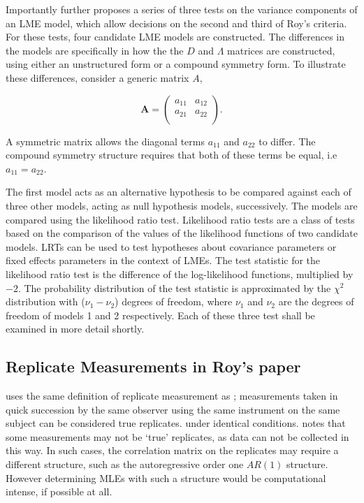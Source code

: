 \documentclass[12pt, a4paper]{report}
\theoremstyle{plain}
\theoremstyle{definition}
\theoremstyle{remark}
\begin{document}
		Importantly \citet{ARoy2009} further proposes a series of three tests on the variance components of an LME model, which allow decisions on the second and third of Roy's criteria. For these tests, four candidate LME models are constructed. The differences in the models are specifically in how the the $D$ and $\Lambda$ matrices are constructed, using either an unstructured form or a compound symmetry form. To illustrate these differences, consider a generic matrix $A$,
		
		\[
		\boldsymbol{A} = \left( \begin{array}{cc}
		a_{11} & a_{12}  \\
		a_{21} & a_{22}  \\
		\end{array}\right).
		\]
		
		A symmetric matrix allows the diagonal terms $a_{11}$ and $a_{22}$ to differ. The compound symmetry structure requires that both of these terms be equal, i.e $a_{11} = a_{22}$.
		
		The first model acts as an alternative hypothesis to be compared against each of three other models, acting as null hypothesis models, successively. The models are compared using the likelihood ratio test. Likelihood ratio tests are a class of tests based on the comparison of the values of the likelihood functions of two candidate models. LRTs can be used to test hypotheses about covariance parameters or fixed effects parameters in the context of LMEs. The test statistic for the likelihood ratio test is the difference of the log-likelihood functions, multiplied by $-2$.
		The probability distribution of the test statistic is approximated by the $\chi^2$ distribution with ($\nu_{1} - \nu_{2}$) degrees of freedom, where $\nu_{1}$ and $\nu_{2}$ are the degrees of freedom of models 1 and 2 respectively. Each of these three test shall be examined in more detail shortly.
		

	\subsection{Replicate Measurements in Roy's paper}
	
	
	\citet{ARoy2009} uses the same definition of replicate measurement as \citet{BA99}; 	measurements taken in quick succession by the same observer using the same instrument on the same subject can be considered true replicates.
	under identical conditions. \citet{ARoy2009} notes that some measurements may not be `true' replicates, as data can not be collected in this way. In such cases, the correlation matrix on the replicates may require a different structure, such as the autoregressive order one $AR(1)$ structure. However determining MLEs with such a structure would be computational intense, if possible at all.
	
\end{document}
